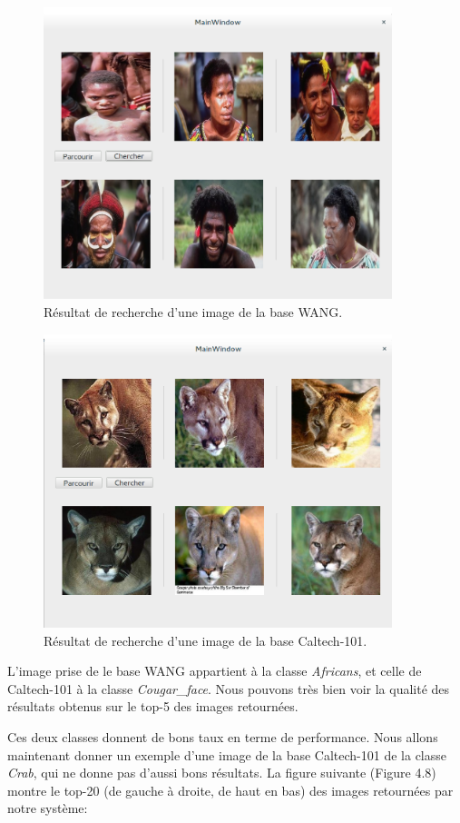 \begin{figure}[H]
	\centering
		\includegraphics[width=4in]{Figures/guiTests1.png}
	\caption[]{Résultat de recherche d'une image de la base WANG.}
	\label{fig:Electron}
\end{figure}

\begin{figure}[H]
	\centering
		\includegraphics[width=4in]{Figures/guiTests2.png}
	\caption[]{Résultat de recherche d'une image de la base Caltech-101.}
	\label{fig:Electron}
\end{figure}


	L'image prise de le base WANG appartient à la classe \textit{Africans}, et celle de Caltech-101 à la classe \textit{Cougar\_face}. Nous pouvons très bien voir la qualité des résultats obtenus sur le top-5 des images retournées.
	
	Ces deux classes donnent de bons taux en terme de performance. Nous allons maintenant donner un exemple d'une image de la base Caltech-101 de la classe \textit{Crab}, qui ne donne pas d'aussi bons résultats. La figure suivante (Figure 4.8) montre le top-20 (de gauche à droite, de haut en bas) des images retournées par notre système:

